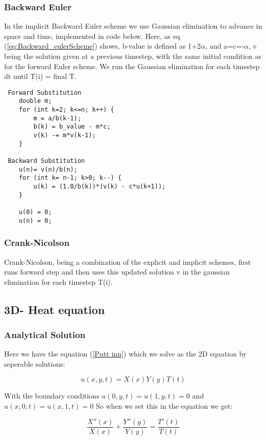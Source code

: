 \documentclass[a4paper,10pt]{article}
\begin{document}
\subsubsection{Backward Euler}
In the implicit Backward Euler scheme we use Gaussian elimination to advance in space and time, implemented in code below. Here, as eq (\ref{eq:Backward_eulerScheme}) shows, b-value is defined as
1+2$\alpha$, and a=c=-$\alpha$, v being the solution given at a previous timestep, with the same initial condition as for the forward Euler scheme. We run the Gaussian elimination for each timestep dt until T(i) = final T.

\begin{verbatim}
 Forward Substitution
    double m;
    for (int k=2; k<=n; k++) {
        m = a/b(k-1);
        b(k) = b_value - m*c;
        v(k) -= m*v(k-1);
    }

 Backward Substitution
    u(n)= v(n)/b(n);
    for (int k= n-1; k>0; k--) {
        u(k) = (1.0/b(k))*(v(k) - c*u(k+1));
    }

    u(0) = 0;
    u(n) = 0;
\end{verbatim}

\subsubsection{Crank-Nicolson}
Crank-Nicolson, being a combination of the explicit and implicit schemes, first runs forward step and then uses this updated solution v in the gaussian elimination for each timestep T(i).

\subsection{3D- Heat equation}
\subsubsection{Analytical Solution}
Here we have the equation (\ref{Putt inn}) which we solve as the 2D equation by seperable solutions:

\begin{equation}
 u(x,y,t) = X(x)Y(y)T(t)
\end{equation}

With the boundary conditions $u(0,y,t) = u(1,y,t) = 0$ and $u(x,0,t) = u(x,1,t) = 0$
So when we set this in the equation we get:

\begin{equation}
 \frac{X''(x)}{X(x)} + \frac{Y''(y)}{Y(y)} = \frac{T'(t)}{T(t)} 
\end{equation}
\end{document}
